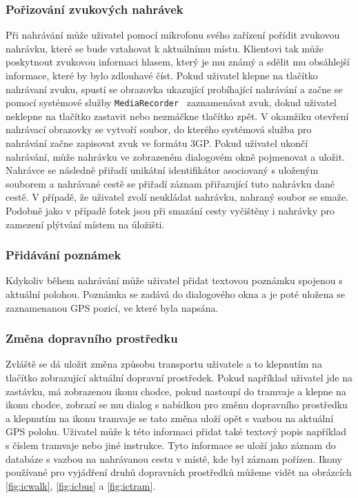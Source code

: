 \documentclass[czech,master,public,dept460,male,java,cpdeclaration]{diploma}
\begin{document}
\subsubsection{Pořizování zvukových nahrávek}
Při nahrávání může uživatel pomocí mikrofonu svého zařízení pořídit zvukovou nahrávku, které se bude
vztahovat k aktuálnímu místu. Klientovi tak může poskytnout zvukovou
informaci hlasem, který je mu známý a sdělit mu obsáhlejší informace, které by bylo zdlouhavé číst.
Pokud uživatel klepne na tlačítko nahrávaní zvuku, spustí se obrazovka ukazující probíhající nahrávání
a začne se pomocí systémové služby \texttt{MediaRecorder}~\cite{androiddevelopers} zaznamenávat zvuk,
dokud uživatel neklepne na tlačítko zastavit nebo nezmáčkne tlačítko zpět.
V okamžiku otevření nahrávací obrazovky se vytvoří soubor, do kterého systémová služba pro nahrávání
začne zapisovat zvuk ve formátu 3GP.
Pokud uživatel ukončí nahrávání, může nahrávku ve zobrazeném dialogovém okně pojmenovat a uložit.
Nahrávce se následně přiřadí unikátní
identifikátor asociovaný s uloženým souborem a nahrávané cestě se přiřadí záznam přiřazující tuto
nahrávku dané cestě. V případě, že uživatel zvolí neukládat nahrávku, nahraný soubor se smaže.
Podobně jako v případě fotek jsou při smazání cesty vyčištěny i nahrávky pro zamezení plýtvání místem
na úložišti.

\subsubsection{Přidávání poznámek}
Kdykoliv během nahrávání může uživatel přidat textovou poznámku spojenou s aktuální polohou.
 Poznámka se zadává do dialogového okna a je poté uložena se zaznamenanou GPS pozicí, ve které byla napsána.

\subsubsection{Změna dopravního prostředku}
Zvláště se dá uložit změna způsobu transportu uživatele a to klepnutím na tlačítko zobrazující
aktuální dopravní prostředek. Pokud například uživatel jde na zastávku, má zobrazenou ikonu chodce,
pokud nastoupí do tramvaje a klepne na ikonu chodce, zobrazí se mu dialog s nabídkou pro změnu dopravního
prostředku a klepnutím na ikonu tramvaje se tato změna uloží opět s vazbou na aktuální GPS polohu.
Uživatel může k této informaci přidat také textový popis například s číslem tramvaje nebo jiné instrukce.
Tyto informace se uloží jako záznam do databáze s vazbou na nahrávanou cestu v místě, kde byl záznam pořízen.
Ikony používané pro vyjádření druhů dopravních prostředků můžeme vidět na obrázcích \ref{fig:icwalk},
\ref{fig:icbus} a \ref{fig:ictram}.
\end{document}
